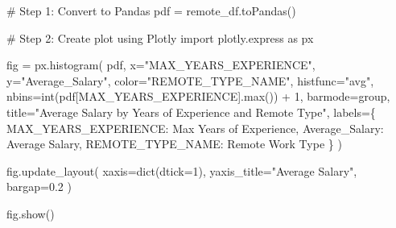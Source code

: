 \documentclass[
  letterpaper,
  DIV=11,
  numbers=noendperiod]{scrartcl}
\newenvironment{Shaded}{\begin{snugshade}}{\end{snugshade}}
\newcommand{\BuiltInTok}[1]{\textcolor[rgb]{0.00,0.23,0.31}{#1}}
\newcommand{\CommentTok}[1]{\textcolor[rgb]{0.37,0.37,0.37}{#1}}
\newcommand{\DecValTok}[1]{\textcolor[rgb]{0.68,0.00,0.00}{#1}}
\newcommand{\FloatTok}[1]{\textcolor[rgb]{0.68,0.00,0.00}{#1}}
\newcommand{\ImportTok}[1]{\textcolor[rgb]{0.00,0.46,0.62}{#1}}
\newcommand{\NormalTok}[1]{\textcolor[rgb]{0.00,0.23,0.31}{#1}}
\newcommand{\OperatorTok}[1]{\textcolor[rgb]{0.37,0.37,0.37}{#1}}
\newcommand{\StringTok}[1]{\textcolor[rgb]{0.13,0.47,0.30}{#1}}
\begin{document}
\begin{Shaded}
\begin{Highlighting}[]
\CommentTok{\# Step 1: Convert to Pandas}
\NormalTok{pdf }\OperatorTok{=}\NormalTok{ remote\_df.toPandas()}

\CommentTok{\# Step 2: Create plot using Plotly}
\ImportTok{import}\NormalTok{ plotly.express }\ImportTok{as}\NormalTok{ px}

\NormalTok{fig }\OperatorTok{=}\NormalTok{ px.histogram(}
\NormalTok{    pdf,}
\NormalTok{    x}\OperatorTok{=}\StringTok{"MAX\_YEARS\_EXPERIENCE"}\NormalTok{,}
\NormalTok{    y}\OperatorTok{=}\StringTok{"Average\_Salary"}\NormalTok{,}
\NormalTok{    color}\OperatorTok{=}\StringTok{"REMOTE\_TYPE\_NAME"}\NormalTok{,}
\NormalTok{    histfunc}\OperatorTok{=}\StringTok{"avg"}\NormalTok{,}
\NormalTok{    nbins}\OperatorTok{=}\BuiltInTok{int}\NormalTok{(pdf[}\StringTok{\textquotesingle{}MAX\_YEARS\_EXPERIENCE\textquotesingle{}}\NormalTok{].}\BuiltInTok{max}\NormalTok{()) }\OperatorTok{+} \DecValTok{1}\NormalTok{,}
\NormalTok{    barmode}\OperatorTok{=}\StringTok{\textquotesingle{}group\textquotesingle{}}\NormalTok{,}
\NormalTok{    title}\OperatorTok{=}\StringTok{"Average Salary by Years of Experience and Remote Type"}\NormalTok{,}
\NormalTok{    labels}\OperatorTok{=}\NormalTok{\{}
        \StringTok{\textquotesingle{}MAX\_YEARS\_EXPERIENCE\textquotesingle{}}\NormalTok{: }\StringTok{\textquotesingle{}Max Years of Experience\textquotesingle{}}\NormalTok{,}
        \StringTok{\textquotesingle{}Average\_Salary\textquotesingle{}}\NormalTok{: }\StringTok{\textquotesingle{}Average Salary\textquotesingle{}}\NormalTok{,}
        \StringTok{\textquotesingle{}REMOTE\_TYPE\_NAME\textquotesingle{}}\NormalTok{: }\StringTok{\textquotesingle{}Remote Work Type\textquotesingle{}}
\NormalTok{    \}}
\NormalTok{)}

\NormalTok{fig.update\_layout(}
\NormalTok{    xaxis}\OperatorTok{=}\BuiltInTok{dict}\NormalTok{(dtick}\OperatorTok{=}\DecValTok{1}\NormalTok{),}
\NormalTok{    yaxis\_title}\OperatorTok{=}\StringTok{"Average Salary"}\NormalTok{,}
\NormalTok{    bargap}\OperatorTok{=}\FloatTok{0.2}
\NormalTok{)}

\NormalTok{fig.show()}
\end{Highlighting}
\end{Shaded}
\end{document}
